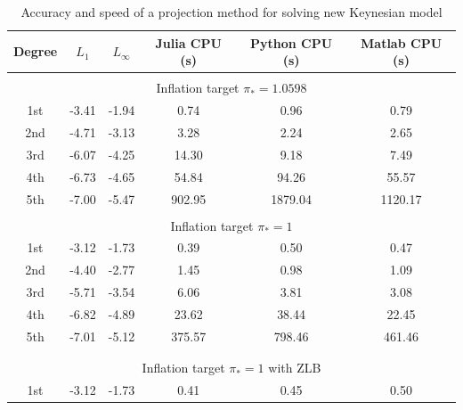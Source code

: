 \begin{table}[tph]
  \caption{Accuracy and speed of a projection method for solving new Keynesian model}
  \label{clmm:Table3}\vspace{-0.3cm}
  \par
  \begin{center}
    \begin{threeparttable}
      {
      \footnotesize
        \begin{tabular}{c|cc|ccc}
          \hline \hline
          Degree & $L_1$ & $L_\infty$ & Julia CPU (s) & Python CPU (s) & Matlab CPU (s) \\ \hline
          \multicolumn{6}{c}{} \\
          \multicolumn{6}{c}{Inflation target $\pi_*=1.0598$} \\ \hline
          1st    & -3.41 &  -1.94 &           0.74 &            0.96 &            0.79 \\
          2nd    & -4.71 &  -3.13 &           3.28 &            2.24 &            2.65 \\
          3rd    & -6.07 &  -4.25 &          14.30 &            9.18 &            7.49 \\
          4th    & -6.73 &  -4.65 &          54.84 &           94.26 &           55.57 \\
          5th    & -7.00 &  -5.47 &         902.95 &         1879.04 &         1120.17 \\  \hline
          \multicolumn{6}{c}{} \\
          \multicolumn{6}{c}{Inflation target $\pi_*=1$} \\ \hline
          1st    & -3.12 &  -1.73 &           0.39 &            0.50 &            0.47 \\
          2nd    & -4.40 &  -2.77 &           1.45 &            0.98 &            1.09 \\
          3rd    & -5.71 &  -3.54 &           6.06 &            3.81 &            3.08 \\
          4th    & -6.82 &  -4.89 &          23.62 &           38.44 &           22.45 \\
          5th    & -7.01 &  -5.12 &         375.57 &          798.46 &          461.46 \\\\ \hline
          \multicolumn{6}{c}{} \\
          \multicolumn{6}{c}{Inflation target $\pi_*=1$ with ZLB} \\ \hline
          1st    & -3.12 &  -1.73 &           0.41 &            0.45 &            0.50 \\

\end{tabular}}
\end{threeparttable}
\end{center}
\end{table}
